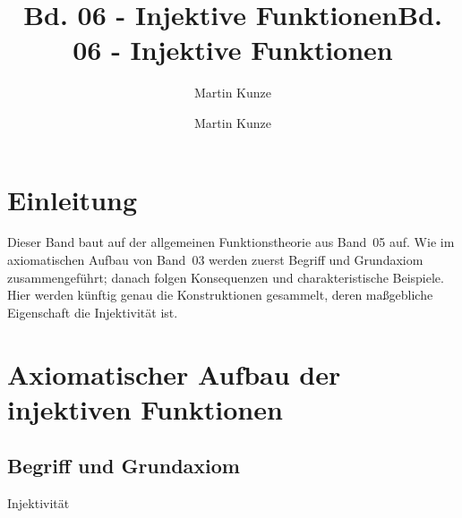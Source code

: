 \documentclass[main.tex]{subfiles}
\title{Bd. 06 - Injektive Funktionen}
\author{Martin Kunze}
\date{}
\begin{document}
\title{Bd. 06 - Injektive Funktionen}
\author{Martin Kunze}
\date{}
\hypersetup{pageanchor=false}
\maketitle
\hypersetup{pageanchor=true}
\setcounter{tocdepth}{3}
\tableofcontents
\setcounter{file}{6}
\renewcommand{\FormulaBandID}{6}

\chapter{Einleitung}

Dieser Band baut auf der allgemeinen Funktionstheorie aus Band~05 auf. Wie im
axiomatischen Aufbau von Band~03 werden zuerst Begriff und Grundaxiom
zusammengeführt; danach folgen Konsequenzen und charakteristische Beispiele.
Hier werden künftig genau die Konstruktionen gesammelt, deren maßgebliche
Eigenschaft die Injektivität ist.

\chapter{Axiomatischer Aufbau der injektiven Funktionen}

\section{Begriff und Grundaxiom}


%
{Injektivität}{
}

\begin{tabproof}
\end{tabproof}
\end{document}
